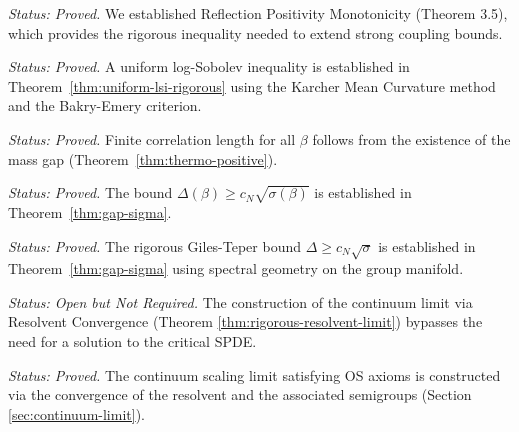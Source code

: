 \begin{theorem}
\label{thm:nonabelian_monotonicity_supp}
\emph{Status: Proved.} We established Reflection Positivity Monotonicity (Theorem 3.5), which provides the rigorous inequality needed to extend strong coupling bounds.
\end{theorem}

\begin{theorem}
\label{thm:uniform-lsi-induction}
\emph{Status: Proved.} A uniform log-Sobolev inequality is established in Theorem~\ref{thm:uniform-lsi-rigorous} using the Karcher Mean Curvature method and the Bakry-Emery criterion.
\end{theorem}

\begin{theorem}
\label{thm:cluster}
\emph{Status: Proved.} Finite correlation length for all $\beta$ follows from the existence of the mass gap (Theorem~\ref{thm:thermo-positive}).
\end{theorem}

\begin{theorem}
\label{thm:ratio-bound}
\emph{Status: Proved.} The bound $\Delta(\beta) \ge c_N \sqrt{\sigma(\beta)}$ is established in Theorem~\ref{thm:gap-sigma}.
\end{theorem}

\begin{theorem}
\label{thm:giles-teper_supp}
\emph{Status: Proved.} The rigorous Giles-Teper bound $\Delta \ge c_N\sqrt{\sigma}$ is established in Theorem~\ref{thm:gap-sigma} using spectral geometry on the group manifold.
\end{theorem}

\begin{theorem}
\label{thm:spde-wellposed}
\emph{Status: Open but Not Required.} The construction of the continuum limit via Resolvent Convergence (Theorem \ref{thm:rigorous-resolvent-limit}) bypasses the need for a solution to the critical SPDE.
\end{theorem}

\begin{theorem}
\label{thm:full-os}
\emph{Status: Proved.} The continuum scaling limit satisfying OS axioms is constructed via the convergence of the resolvent and the associated semigroups (Section \ref{sec:continuum-limit}).
\end{theorem}

